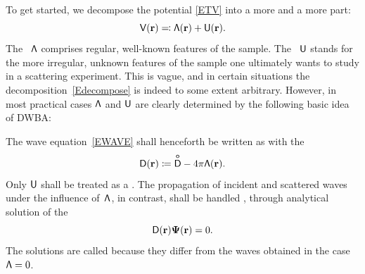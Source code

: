 To get started,
we decompose the potential \cref{ETV}
into a more  and a more  part:
\begin{equation}\label{Edecompose}
  \mathsf{V}(\mathbf{r}) \eqqcolon \mathsf{\Lambda}(\mathbf{r}) + \mathsf{U}(\mathbf{r}).
\end{equation}
The ~$\mathsf{\Lambda}$
%
%
comprises regular, well-known features of the sample.
The ~$\mathsf{U}$
%
%
%
stands for the more irregular, unknown features of the sample
one ultimately wants to study in a scattering experiment.
This is vague,
and in certain situations the decomposition~\cref{Edecompose} is indeed
to some extent arbitrary.
However, in most practical cases $\mathsf{\Lambda}$ and $\mathsf{U}$ are clearly determined by
the following basic idea of DWBA:

The wave equation~\cref{EWAVE} shall henceforth be written as
with the 
%
%
%
\begin{equation}
  \mathsf{D}(\mathbf{r}) \coloneqq \mathsf{\overset{o}{D}} - 4\pi\mathsf{\Lambda}(\mathbf{r}).
\end{equation}
Only $\mathsf{U}$ shall be treated as a .
The propagation of incident and scattered waves under the influence of~$\mathsf{\Lambda}$,
in contrast,
shall be handled ,
through analytical solution of the 
%
%
%
\begin{equation}\label{EDPsi0}
  \mathsf{D}(\mathbf{r})\mathbf{\Psi}(\mathbf{r}) = 0.
\end{equation}
The solutions are called 
%
%
because they differ from the  waves
%
%
obtained in the  case $\mathsf{\Lambda}=0$.
%

